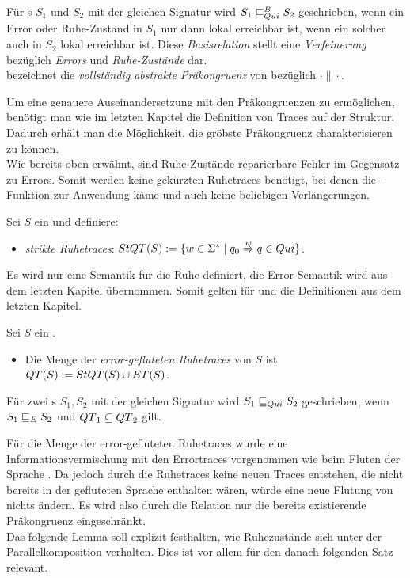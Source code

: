 \begin{Def}
\label{DefQuiBasisrel}
  Für \EIO{}s $S_1$ und $S_2$ mit der gleichen Signatur wird
  $S_1\sqsubseteq _{Qui}^B S_2$ geschrieben, wenn ein Error oder Ruhe-Zustand in $S_1$ nur
  dann lokal erreichbar ist, wenn ein solcher auch in $S_2$ lokal erreichbar
  ist. Diese \emph{Basisrelation} stellt eine \emph{Verfeinerung} bezüglich
  \emph{Errors} und \emph{Ruhe-Zustände} dar.\\
  \QCRel{} bezeichnet die \emph{vollständig abstrakte Präkongruenz} von
  \QBRel{} bezüglich $\cdot\|\cdot$.
\end{Def}

Um eine genauere Auseinandersetzung mit den Präkongruenzen zu ermöglichen,
benötigt man wie im letzten Kapitel die Definition von Traces auf der Struktur.
Dadurch erhält man die Möglichkeit, die gröbste Präkongruenz charakterisieren zu
können.\\
Wie bereits oben erwähnt, sind Ruhe-Zustände reparierbare Fehler im Gegensatz
zu Errors. Somit werden keine gekürzten Ruhetraces benötigt, bei denen die
\prune{}-Funktion zur Anwendung käme und auch keine beliebigen Verlängerungen.

\begin{Def}[Ruhetraces]
\label{DefRuhetraces}
  Sei $S$ ein \EIO{} und definiere:
  \begin{itemize}
    \item \emph{strikte Ruhetraces}: $StQT{}(S) := \{w\in\Sigma ^*\mid q_0
      \overset{w}{\Rightarrow} q\in Qui\}$.
  \end{itemize}
\end{Def}

Es wird nur eine Semantik für die Ruhe definiert, die Error-Semantik wird aus
dem letzten Kapitel übernommen. Somit gelten für \ET{} und \EL{} die
Definitionen aus dem letzten Kapitel.

\begin{Def}
\label{DefQTQL}
  Sei $S$ ein \EIO{}.
  \begin{itemize}
    \item Die Menge der \emph{error-gefluteten Ruhetraces} von $S$ ist
      $QT{}(S) := StQT{}(S)\cup ET{}(S)$.
  \end{itemize}
  Für zwei \EIO{}s $S_1, S_2$ mit der gleichen Signatur wird
  $S_1\sqsubseteq _{Qui} S_2$ geschrieben, wenn $S_1\sqsubseteq _E S_2$ und $QT{}_1\subseteq
  QT{}_2$ gilt.
\end{Def}

Für die Menge der error-gefluteten Ruhetraces \QT{} wurde eine Informationsvermischung
mit den Errortraces vorgenommen wie beim Fluten der Sprache \EL{}. Da jedoch
durch die Ruhetraces keine neuen Traces entstehen, die nicht bereits in der
gefluteten Sprache \EL{} enthalten wären, würde eine neue Flutung von \EL{}
nichts ändern. Es wird also durch die Relation \QRel{} nur die
bereits existierende Präkongruenz \ERel{} eingeschränkt.\\
Das folgende Lemma soll explizit festhalten, wie Ruhezustände sich unter der
Parallelkomposition verhalten. Dies ist vor allem für den danach folgenden Satz
relevant.

